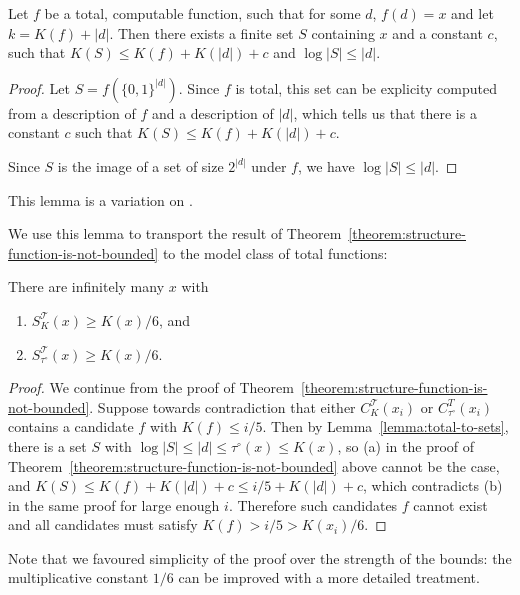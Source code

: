 \documentclass{style/llncs}
\newcommand{\T}{\mathscr T}
\begin{document}
% 

\begin{lemma}
Let $f$ be a total, computable function, such that for some $d$, $f(d) = x$ and let $k = K(f) + |d|$. Then there exists a finite set $S$ containing $x$ and a constant $c$, such that $K(S) \leq K(f) + K(|d|) + c$ and $\log |S| \leq |d|$.\label{lemma:total-to-sets}
\end{lemma}
\begin{proof}
Let $S = f\left(\{0,1\}^{|d|}\right)$. Since $f$ is total, this set can be explicity computed from a description of $f$ and a description of $|d|$, which tells us that there is a constant $c$ such that $K(S) \leq K(f) + K(|d|) + c$. 

Since $S$ is the image of a set of size $2^{|d|}$ under $f$, we have $\log |S| \leq |d|$.
\end{proof}
This lemma is a variation on \cite[Lemma~7.2]{vitanyi2004meaningful}.

We use this lemma to transport the result of Theorem~\ref{theorem:structure-function-is-not-bounded} to the model class of total functions:

\begin{theorem}
There are infinitely many $x$ with 
\begin{enumerate}
  \item $S^\T_K(x) \geq K(x)/6$, {and}\label{eq:poezenvoer}
  \item $S^\T_{\tau^\circ}(x) \geq K(x)/6$. \label{eq:hondevoer}
\end{enumerate}
\end{theorem}
\begin{proof}
We continue from the proof of Theorem~\ref{theorem:structure-function-is-not-bounded}. Suppose towards contradiction that either $C^\T_K(x_i)$ or $C^T_{\tau^\circ}(x_i)$ contains a candidate $f$ with $K(f)\le i/5$. Then by Lemma~\ref{lemma:total-to-sets}, there is a set $S$ with $\log|S|\le|d|\le\tau^\circ(x)\le K(x)$, so (a) in the proof of Theorem~\ref{theorem:structure-function-is-not-bounded} above cannot be the case, and $K(S)\le K(f)+K(|d|)+c\le i/5+K(|d|)+c$, which contradicts (b) in the same proof for large enough $i$. Therefore such candidates $f$ cannot exist and all candidates must satisfy $K(f)>i/5>K(x_i)/6$.
\end{proof}
Note that we favoured simplicity of the proof over the strength of the bounds: the multiplicative constant $1/6$ can be improved with a more detailed treatment.
\end{document}
